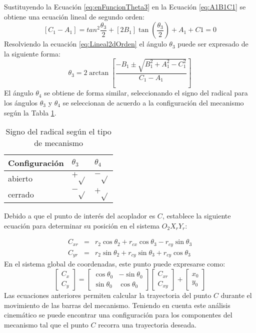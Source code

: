 Sustituyendo la Ecuación \ref{eq:enFuncionTheta3} en la Ecuación \ref{eq:A1B1C1} se obtiene una ecuación lineal de segundo orden:
\begin{equation} \label{eq:Lineal2dOrden}
 \left[C_1 -A_1\right]= tan^2{\frac{\theta_3}{2}}+\left[2B_1\right]\tan{(\frac{\theta_3}{2})}+A_1+C1=0
\end{equation}
Resolviendo la ecuación \ref{eq:Lineal2dOrden} el ángulo $\theta_3$ puede ser expresado de la siguiente forma:
\begin{equation} \label{eq:Lineal2dOrden}
\theta_3= 2\arctan \left[ \frac{-B_1 \pm \sqrt{B^2_1+A^2_1-C^2_1}}{C_1-A_1} \right]
\end{equation}
El ángulo $\theta_4$ se obtiene de forma similar, seleccionando el signo del radical para los
ángulos $\theta_3$ y $\theta_4$ se seleccionan de acuerdo a la configuración del mecanismo según
la Tabla \ref{tab:Signo del radical}.
\begin{table}[]
\centering
\begin{tabular}{|l|l|l|}
\hline
\textbf{Configuración}& $\theta_3$& $\theta_4$  \\ \hline
abierto &  $+ \sqrt{}$&   $- \sqrt{}$  \\ \hline
cerrado & $- \sqrt{}$ & $ + \sqrt{}$  \\ \hline
\end{tabular}
\caption{Signo del radical según el tipo de mecanismo}
\label{tab:Signo del radical}
\end{table}

Debido a que el punto de interés del acoplador es $C$, establece la siguiente ecuación para  determinar su posición en el sistema $O_2 X_r Y_r$:

\begin{eqnarray}
C_{xr}&=&r_2\cos{\theta_2} +r_{cx}\cos{\theta_3}-r_{cy}\sin{\theta_3} \label{eq:Cxr} \\
C_{yr}&=&r_2\sin{\theta_2} +r_{cy}\sin{\theta_3}+r_{cy}\cos{\theta_3}\label{eq:Cyr}
\end{eqnarray}
En el sistema global de coordenadas, este punto puede expresarse como:
\begin{equation}
 \begin{bmatrix}
  C_x\\
  C_y
\end{bmatrix}=
 \begin{bmatrix}
  \cos{\theta_0} & -\sin{\theta_0} \\
    \sin{\theta_0} & \cos{\theta_0} 
\end{bmatrix}
 \begin{bmatrix}
  C_{xr}\\
  C_{xy}
\end{bmatrix}+
 \begin{bmatrix}
  x_0\\
  y_0
\end{bmatrix}
 \end{equation}
Las ecuaciones anteriores permiten calcular la trayectoria del punto $C$ durante el movimiento de  las barras del mecanismo. Teniendo en cuenta este análisis cinemático se puede encontrar una configuración para los componentes del mecanismo tal que el punto $C$ recorra una trayectoria deseada. 

